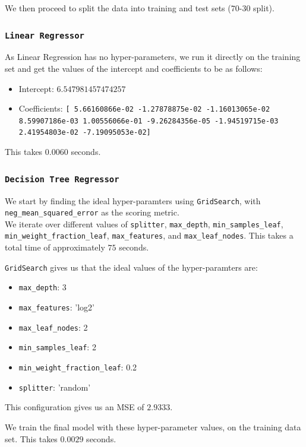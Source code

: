 \documentclass{article}
\begin{document}
    We then proceed to split the data into training and test sets ($70$-$30$ split).

\subsubsection{\texttt{Linear Regressor}}
    As Linear Regression has no hyper-parameters, we run it directly on the training set and get the values of the intercept and coefficients to be as follows:
    \begin{itemize}
        \item Intercept: $6.547981457474257$
        \item Coefficients: \verb|[ 5.66160866e-02 -1.27878875e-02 -1.16013065e-02  8.59907186e-03 1.00556066e-01 -9.26284356e-05 -1.94519715e-03 2.41954803e-02 -7.19095053e-02]|
    \end{itemize}

    This takes $0.0060$ seconds.

\subsubsection{\texttt{Decision Tree Regressor}}
    We start by finding the ideal hyper-paramters using \verb|GridSearch|, with \verb|neg_mean_squared_error| as the scoring metric. \\
    We iterate over different values of \verb|splitter|, \verb|max_depth|, \verb|min_samples_leaf|, \verb|min_weight_fraction_leaf|, \verb|max_features|, and \verb|max_leaf_nodes|. This takes a total time of approximately $75$ seconds.

    \verb|GridSearch| gives us that the ideal values of the hyper-paramters are:
    \begin{itemize}
        \item \verb|max_depth|: 3
        \item \verb|max_features|: 'log2'
        \item \verb|max_leaf_nodes|: 2
        \item \verb|min_samples_leaf|: 2
        \item \verb|min_weight_fraction_leaf|: 0.2
        \item \verb|splitter|: 'random'
    \end{itemize}
    This configuration gives us an MSE of $2.9333$.

    We train the final model with these hyper-parameter values, on the training data set. This takes $0.0029$ seconds.
\end{document}
